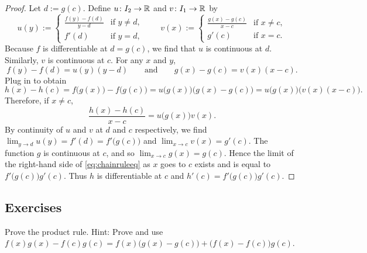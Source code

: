 \begin{proof}
Let $d := g(c)$.  Define
$u \colon I_2 \to {\mathbb{R}}$ and $v \colon I_1 \to {\mathbb{R}}$ by
\begin{equation*}
u(y) :=
\begin{cases}
 \frac{f(y) - f(d)}{y-d}  & \text{if } y \not=d, \\
 f'(d)                    & \text{if } y = d,
\end{cases}
\qquad
v(x) :=
\begin{cases}
 \frac{g(x) - g(c)}{x-c} & \text{if } x \not=c, \\
 g'(c)                   & \text{if } x = c.
\end{cases}
\end{equation*}
Because $f$ is differentiable at $d = g(c)$, we find that
$u$ is continuous at $d$.  Similarly, $v$ is continuous at $c$.
For any $x$ and $y$,
\begin{equation*}
f(y)-f(d) = u(y) (y-d)
\qquad \text{and} \qquad
g(x)-g(c) = v(x) (x-c) .
\end{equation*}
Plug in to obtain
\begin{equation*}
h(x)-h(c)
=
f\bigl(g(x)\bigr)-f\bigl(g(c)\bigr)
=
u\bigl( g(x) \bigr) \bigl(g(x)-g(c)\bigr)
=
u\bigl( g(x) \bigr) \bigl(v(x) (x-c)\bigr) .
\end{equation*}
Therefore, if $x \not= c$,
\begin{equation} \label{eq:chainruleeq}
\frac{h(x)-h(c)}{x-c}
=
u\bigl( g(x) \bigr) v(x) .
\end{equation}
By continuity of $u$ and $v$ at $d$ and $c$ respectively, we find
$\lim_{y \to d} u(y)
= f'(d) = f'\bigl(g(c)\bigr)$ and
$\lim_{x \to c} v(x) = g'(c)$.
The function $g$ is continuous at $c$, and so $\lim_{x \to c} g(x) = g(c)$.
Hence the limit of
the right-hand side of \eqref{eq:chainruleeq}
as $x$ goes to $c$
exists and is equal to $f'\bigl(g(c)\bigr) g'(c)$.  Thus $h$
is differentiable at $c$ and $h'(c) = f'\bigl(g(c)\bigr)g'(c)$.
\end{proof}

\subsection{Exercises}

\begin{exercise}
Prove the product rule.
Hint: Prove and use
$f(x) g(x) - f(c) g(c) = f(x)\bigl( g(x) - g(c) \bigr) + \bigl( f(x) -
f(c) \bigr) g(c)$.
\end{exercise}

